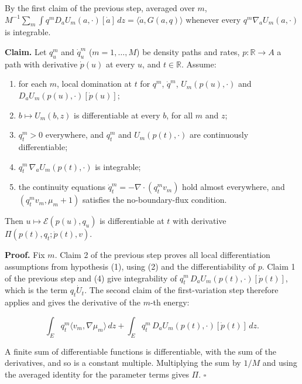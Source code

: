 \documentclass[11pt,a4paper]{report}
\begin{document}
By the first claim of the previous step, averaged over \(m\), \(M^{-1}\sum_m\int q^mD_aU_m(a,\cdot)[\dot a]\,dz=\langle\dot a,G(a,q)\rangle\) whenever every \(q^m\nabla_aU_m(a,\cdot)\) is integrable.




\textbf{Claim.} Let \(q^m_u\) and \(\dot q^m_u\) (\(m=1,\dots,M\)) be density paths and rates, \(p:\mathbb R\to A\) a path with derivative \(\dot p(u)\) at every \(u\), and \(t\in\mathbb R\). Assume:



\begin{enumerate}


\item for each \(m\), local domination at \(t\) for \(q^m\), \(\dot q^m\), \(U_m(p(u),\cdot)\) and \(D_aU_m(p(u),\cdot)[\dot p(u)]\);

\item \(b\mapsto U_m(b,z)\) is differentiable at every \(b\), for all \(m\) and \(z\);

\item \(q^m_t>0\) everywhere, and \(q^m_t\) and \(U_m(p(t),\cdot)\) are continuously differentiable;

\item \(q^m_t\,\nabla_aU_m(p(t),\cdot)\) is integrable;

\item the continuity equations \(\dot q^m_t=-\nabla\cdot(q^m_tv_m)\) hold almost everywhere, and \((q^m_tv_m,\mu_m+1)\) satisfies the no-boundary-flux condition.

\end{enumerate}



Then \(u\mapsto\mathcal E(p(u),q_u)\) is differentiable at \(t\) with derivative \(\Pi(p(t),q_t;\dot p(t),v)\).




\textbf{Proof.} Fix \(m\). Claim 2 of the previous step proves all local differentiation assumptions from hypothesis (1), using (2) and the differentiability of \(p\). Claim 1 of the previous step and (4) give integrability of \(q^m_t\,D_aU_m(p(t),\cdot)[\dot p(t)]\), which is the term \(q_t\dot U_t\). The second claim of the first-variation step therefore applies and gives the derivative of the \(m\)-th energy:


\[\int_Eq^m_t\langle v_m,\nabla\mu_m\rangle\,dz+\int_Eq^m_t\,D_aU_m(p(t),\cdot)[\dot p(t)]\,dz.\]


A finite sum of differentiable functions is differentiable, with the sum of the derivatives, and so is a constant multiple. Multiplying the sum by \(1/M\) and using the averaged identity for the parameter terms gives \(\Pi\). \(\square\)
\end{document}
